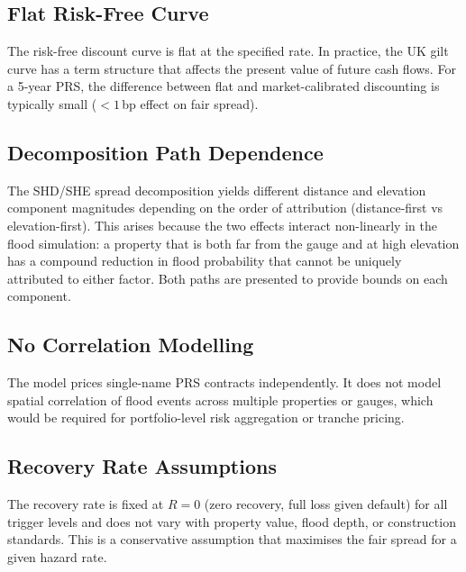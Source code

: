 \documentclass[11pt,a4paper]{article}
\begin{document}
\subsection{Flat Risk-Free Curve}

The risk-free discount curve is flat at the specified rate. In practice, the UK gilt
curve has a term structure that affects the present value of future cash flows. For a
5-year PRS, the difference between flat and market-calibrated discounting is typically
small ($<1$\,bp effect on fair spread).

\subsection{Decomposition Path Dependence}

The SHD/SHE spread decomposition yields different distance and elevation component
magnitudes depending on the order of attribution (distance-first vs elevation-first).
This arises because the two effects interact non-linearly in the flood simulation:
a property that is both far from the gauge and at high elevation has a compound
reduction in flood probability that cannot be uniquely attributed to either factor.
Both paths are presented to provide bounds on each component.

\subsection{No Correlation Modelling}

The model prices single-name PRS contracts independently. It does not model spatial
correlation of flood events across multiple properties or gauges, which would be
required for portfolio-level risk aggregation or tranche pricing.

\subsection{Recovery Rate Assumptions}

The recovery rate is fixed at $R = 0$ (zero recovery, full loss given default) for all
trigger levels and does not vary with property value, flood depth, or construction
standards. This is a conservative assumption that maximises the fair spread for a given
hazard rate.


\mkmgovernance
\end{document}
